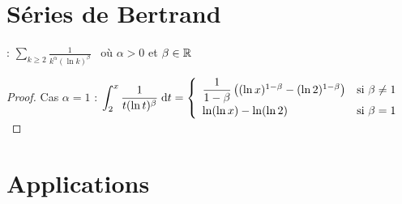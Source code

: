 \section{Séries de Bertrand}

\begin{frame}
 : 
$\displaystyle\sum_{k\ge2} \frac{1}{k^\alpha(\ln k)^\beta}$ \ où $ \alpha > 0$ et $\beta \in \mathbb{R}$

\pause
\begin{proposition}

\pause
{}
\end{proposition}

\pause
\begin{proof}
\pause
Cas $\alpha=1$ :  \quad \pause
$
\displaystyle\int_2^{x} \frac{1}{t(\ln t)^{\beta}}\;\text{d} t =
\left\{\begin{array}{ll}
{\dfrac{1}{1-\beta}\left((\ln x)^{1-\beta}-(\ln 2)^{1-\beta}\right)}&\text{si }\beta\neq
    1\\[1.5ex]
\ln(\ln x)-\ln(\ln 2) &\text{si }\beta=1 \qedhere
\end{array}\right. 
$
\end{proof}
\end{frame}


\section{Applications}

